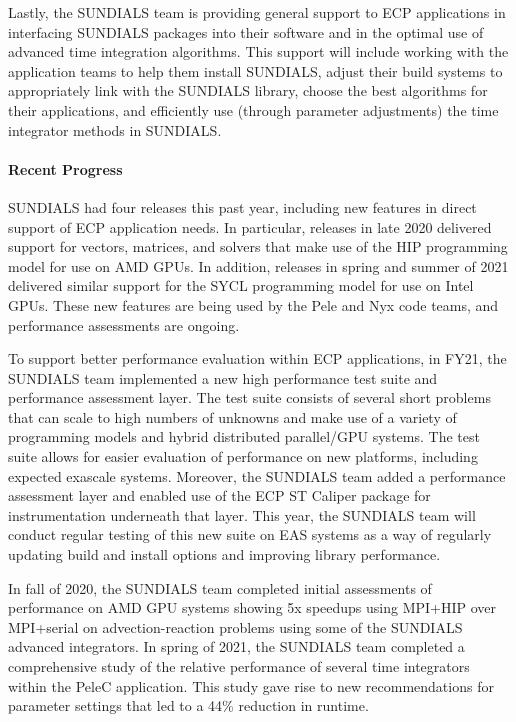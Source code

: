 Lastly, the SUNDIALS team is providing general support to ECP applications in
interfacing SUNDIALS packages into their software and in the optimal use of
advanced time integration algorithms.  This support will include working with
the application teams to help them install SUNDIALS, adjust their build systems
to appropriately link with the SUNDIALS library, choose the best algorithms for
their applications, and efficiently use (through parameter adjustments) the time
integrator methods in SUNDIALS.

\paragraph{Recent Progress}

SUNDIALS had four releases this past year, including new features in direct
support of ECP application needs.  In particular, releases in late 2020
delivered support for vectors, matrices, and solvers that make use of the HIP
programming model for use on AMD GPUs.  In addition, releases in spring and
summer of 2021 delivered similar support for the SYCL programming model for use
on Intel GPUs.  These new features are being used by the Pele and Nyx code
teams, and performance assessments are ongoing.

To support better performance evaluation within ECP applications, in FY21, the
SUNDIALS team implemented a new high performance test suite and performance
assessment layer.  The test suite consists of several short problems that can
scale to high numbers of unknowns and make use of a variety of programming
models and hybrid distributed parallel/GPU systems.  The test suite allows for
easier evaluation of performance on new platforms, including expected exascale
systems.  Moreover, the SUNDIALS team added a performance assessment layer and
enabled use of the ECP ST Caliper package for instrumentation underneath that
layer.  This year, the SUNDIALS team will conduct regular testing of this new
suite on EAS systems as a way of regularly updating build and install options
and improving library performance.

In fall of 2020, the SUNDIALS team completed initial assessments of performance
on AMD GPU systems \cite{balosEnablingGPUAccelerated2021} showing 5x speedups
using MPI+HIP over MPI+serial on advection-reaction problems using some of the
SUNDIALS advanced integrators.  In spring of 2021, the SUNDIALS team completed a
comprehensive study of the relative performance of several time integrators
within the PeleC application.  This study gave rise to new recommendations for
parameter settings that led to a 44\% reduction in runtime.

